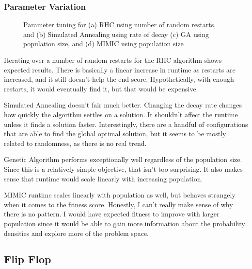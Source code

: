 \documentclass[
	letterpaper, %
]{mlreport}
\begin{document}
\subsubsection{Parameter Variation}
\begin{figure}
	\centering
	\caption{Parameter tuning for (a) RHC using number of random restarts, and (b) Simulated Annealing using rate of decay (c) GA using population size, and (d) MIMIC using population size}
	\label{fig:fig2}
\end{figure}
Iterating over a number of random restarts for the RHC algorithm shows expected results. There is basically a linear increase in runtime as restarts are increased, and it still doesn't help the end score. Hypothetically, with enough restarts, it would eventually find it, but that would be expensive.

Simulated Annealing doesn't fair much better. Changing the decay rate changes how quickly the algorithm settles on a solution. It shouldn't affect the runtime unless it finds a solution faster. Interestingly, there are a handful of configurations that are able to find the global optimal solution, but it seems to be mostly related to randomness, as there is no real trend.

Genetic Algorithm performs exceptionally well regardless of the population size. Since this is a relatively simple objective, that isn't too surprising. It also makes sense that runtime would scale linearly with increasing population.

MIMIC runtime scales linearly with population as well, but behaves strangely when it comes to the fitness score. Honestly, I can't really make sense of why there is no pattern. I would have expected fitness to improve with larger population since it would be able to gain more information about the probability densities and explore more of the problem space.

\subsection{Flip Flop}
\end{document}
